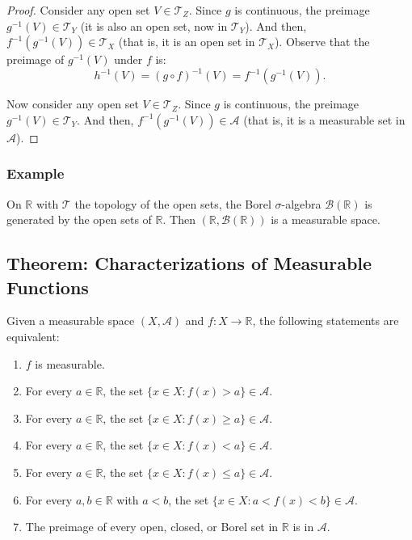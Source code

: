\documentclass[11pt]{article}
\begin{document}
\begin{proof}
Consider any open set \(V \in \mathcal{T}_Z\). Since \(g\) is continuous, the preimage \(g^{-1}(V) \in \mathcal{T}_Y\) (it is also an open set, now in \(\mathcal{T}_Y\)). And then, \(f^{-1}(g^{-1}(V)) \in \mathcal{T}_X\) (that is, it is an open set in \(\mathcal{T}_X\)).
    Observe that the preimage of \(g^{-1}(V)\) under \(f\) is:
    \[h^{-1}(V) = (g \circ f)^{-1}(V) = f^{-1}(g^{-1}(V)).\]

    Now consider any open set \(V \in \mathcal{T}_Z\). Since \(g\) is continuous, the preimage \(g^{-1}(V) \in \mathcal{T}_Y\). And then, \(f^{-1}(g^{-1}(V)) \in \mathcal{A}\) (that is, it is a measurable set in \(\mathcal{A}\)).
\end{proof}

\subsubsection*{Example}
On \(\mathbb{R}\) with \(\mathcal{T}\) the topology of the open sets, the Borel \(\sigma\)-algebra \(\mathcal{B}(\mathbb{R})\) is generated by the open sets of \(\mathbb{R}\). Then \((\mathbb{R}, \mathcal{B}(\mathbb{R}))\) is a measurable space.

\subsection{Theorem: Characterizations of Measurable Functions}
Given a measurable space \((X, \mathcal{A})\) and \(f : X \to \mathbb{R}\), the following statements are equivalent:
\begin{enumerate}
    \item \(f\) is measurable.
    \item For every \(a \in \mathbb{R}\), the set \(\{x \in X : f(x) > a\} \in \mathcal{A}\).
    \item For every \(a \in \mathbb{R}\), the set \(\{x \in X : f(x) \geq a\} \in \mathcal{A}\).
    \item For every \(a \in \mathbb{R}\), the set \(\{x \in X : f(x) < a\} \in \mathcal{A}\).
    \item For every \(a \in \mathbb{R}\), the set \(\{x \in X : f(x) \leq a\} \in \mathcal{A}\).
    \item For every \(a, b \in \mathbb{R}\) with \(a < b\), the set \(\{x \in X : a < f(x) < b\} \in \mathcal{A}\).
    \item The preimage of every open, closed, or Borel set in \(\mathbb{R}\) is in \(\mathcal{A}\).
\end{enumerate}
\end{document}
